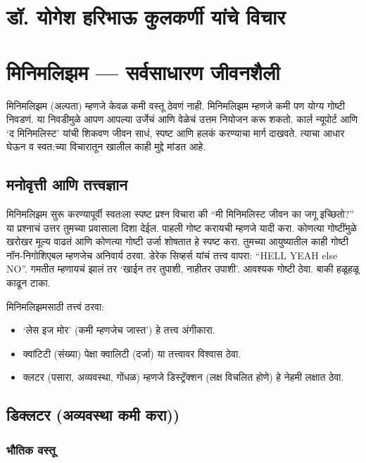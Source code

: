 \chapter*{डॉ. योगेश हरिभाऊ कुलकर्णी  यांचे विचार }

\chapter{मिनिमलिझम — सर्वसाधारण जीवनशैली}

मिनिमलिझम (अल्पता)  म्हणजे केवळ कमी वस्तू ठेवणं नाही. मिनिमलिझम म्हणजे कमी पण योग्य गोष्टी निवडणं. या निवडीमुळे आपण आपल्या उर्जेचं आणि वेळेचं उत्तम नियोजन करू शकतो. कार्ल न्यूपोर्ट आणि ‘द मिनिमलिस्ट’  यांची शिकवण जीवन साधं, स्पष्ट आणि हलकं करण्याचा मार्ग दाखवते. त्याचा आधार घेऊन व स्वत:च्या विचारातून खालील काही मुद्दे मांडत आहे. 

\section*{मनोवृत्ती आणि तत्त्वज्ञान}

मिनिमलिझम सुरू करण्यापूर्वी स्वतःला स्पष्ट प्रश्न विचारा की “मी मिनिमलिस्ट जीवन का जगू इच्छितो?” या प्रश्नाचं उत्तर तुमच्या प्रवासाला दिशा देईल. पाहली गोष्ट करायची म्हणजे यादी करा. कोणत्या गोष्टींमुळे खरोखर मूल्य वाढतं आणि कोणत्या गोष्टी उर्जा शोषतात हे स्पष्ट करा. तुमच्या आयुष्यातील काही गोष्टी नॉन-निगोशिएबल म्हणजेच अनिवार्य ठरवा. डेरेक सिव्हर्स यांचं तत्त्व वापरा: “HELL YEAH else NO”. गमतीत म्हणायचं झालं  तर ‘खाईन तर तुपाशी, नाहीतर उपाशी’. आवश्यक गोष्टी ठेवा. बाकी हळूहळू काढून टाका.

मिनिमलिझमसाठी तत्त्वं ठरवा: 
\begin{itemize}
\item ‘लेस इज मोर’ (कमी म्हणजेच जास्त’) हे तत्त्व अंगीकारा.
\item क्वांटिटी (संख्या) पेक्षा  क्वालिटी (दर्जा) या तत्त्वावर विश्वास ठेवा.
\item क्लटर (पसारा, अव्यवस्था, गोंधळ) म्हणजे डिस्ट्रॅक्शन (लक्ष विचलित होणे) हे नेहमी लक्षात ठेवा.
\end{itemize}

\section*{डिक्लटर (अव्यवस्था कमी करा))}

\subsection*{भौतिक वस्तू}

